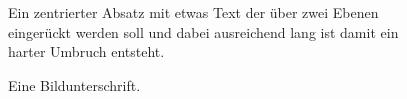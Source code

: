 \begin{figure}
  \begin{center}
    Ein zentrierter Absatz mit etwas Text der über zwei Ebenen eingerückt werden soll und dabei
    ausreichend lang ist damit ein harter Umbruch entsteht.
  \end{center}
  \caption{Eine Bildunterschrift.}
\end{figure}
